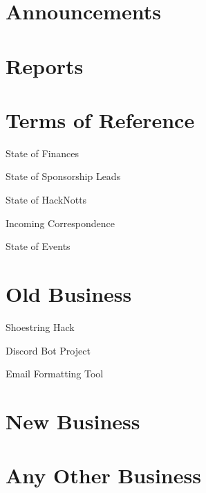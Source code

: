 \documentclass[11pt,hacksoc,agenda]{meetingmins}
\begin{document}
\maketitle

\section{Announcements}


\section{Reports}

\section{Terms of Reference}
\begin{items}
\item {State of Finances}
\item {State of Sponsorship Leads}
\item {State of HackNotts}
\item {Incoming Correspondence}
\item {State of Events}
\end{items}

\section{Old Business}
\begin{items}
\item Shoestring Hack
\item Discord Bot Project
\item Email Formatting Tool
\end{items}

\section{New Business}


\section{Any Other Business}

\vspace{1em}
\end{document}
